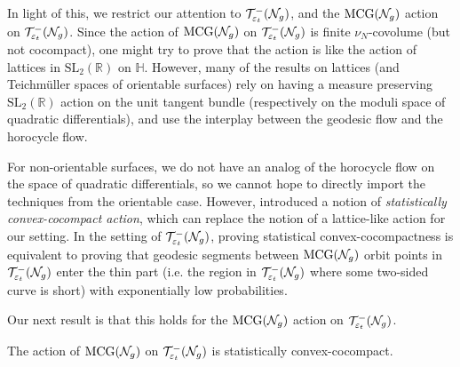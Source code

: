 
In light of this, we restrict our attention to $\mathcal{T}_{\varepsilon_t}^{-}(\mathcal{N}_g)$, and the $\mathrm{MCG}(\mathcal{N}_g)$ action on $\mathcal{T}_{\varepsilon_t}^{-}(\mathcal{N}_g)$.
Since the action of $\mathrm{MCG}(\mathcal{N}_g)$ on $\mathcal{T}_{\varepsilon_t}^{-}(\mathcal{N}_g)$ is finite $\nu_N$-covolume (but not cocompact), one might try to prove that the action is
{like}
the action of lattices in $\mathrm{SL}_2(\mathbb{R})$ on $\mathbb{H}$.
However, many of the results on lattices (and Teichmüller spaces of orientable surfaces) rely on having a measure preserving $\mathrm{SL}_2(\mathbb{R})$ action on the unit tangent bundle (respectively on the moduli space of quadratic differentials), and use the interplay between the geodesic flow and the horocycle flow.

For non-orientable surfaces, we do not have an analog of the horocycle flow on the space of quadratic differentials, so we cannot hope to directly import the techniques from the orientable case.
However, \textcite{10.1093/imrn/rny001} introduced a notion of \emph{statistically convex-cocompact action}, which can replace the notion of a lattice-like action for our setting.
In the setting of $\mathcal{T}_{\varepsilon_t}^{-}(\mathcal{N}_g)$, proving statistical convex-cocompactness is equivalent to proving that geodesic segments between $\mathrm{MCG}(\mathcal{N}_g)$ orbit points in $\mathcal{T}_{\varepsilon_t}^{-}(\mathcal{N}_g)$ enter the thin part (i.e. the region in $\mathcal{T}_{\varepsilon_t}^{-}(\mathcal{N}_g)$ where some two-sided curve is short) with exponentially low probabilities.

Our next result is that this holds for the $\mathrm{MCG}(\mathcal{N}_g)$ action on $\mathcal{T}_{\varepsilon_t}^{-}(\mathcal{N}_g)$.
\begin{theorem}
  \label{thm:statistical-convex-cocompactness}
  The action of $\mathrm{MCG}(\mathcal{N}_g)$ on $\mathcal{T}_{\varepsilon_t}^{-}(\mathcal{N}_g)$ is statistically convex-cocompact.
\end{theorem}

